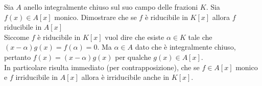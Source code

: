 \begin{esercizio}
	Sia $A$ anello integralmente chiuso sul suo campo delle frazioni $K$. Sia $f(x) \in A[x]$ monico. 
	Dimostrare che se $f$ è riducibile in $K[x]$ allora $f$ riducibile in $A[x]$\\
	
	Siccome $f$ è riducibile in $K[x]$ vuol dire che esiste $\alpha \in K$ tale che $(x-\alpha)g(x) = f(\alpha) = 0$. Ma $\alpha \in A$ 
	dato che è integralmente chiuso, pertanto $f(x) = (x-\alpha)g(x)$ per qualche $g(x) \in A[x]$.\\ 
	
	In particolare risulta immediato (per contrapposizione), 
	che se $f \in A[x]$ monico e $f$ irriducibile in $A[x]$
	allora è irriducibile anche in $K[x]$. 
\end{esercizio}

